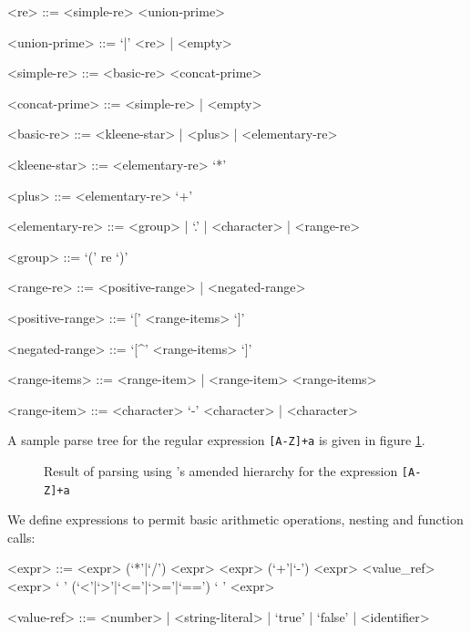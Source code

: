\documentclass[a4paper,openany,12pt]{book}
\begin{document}
\begin{grammar}

    <re> ::= <simple-re> <union-prime>

    <union-prime> ::= `|' <re> | <empty>

    <simple-re> ::= <basic-re> <concat-prime>

    <concat-prime> ::= <simple-re> | <empty>

    <basic-re> ::= <kleene-star> | <plus> | <elementary-re>

    <kleene-star> ::= <elementary-re> `*'

    <plus> ::= <elementary-re> `+'

    <elementary-re> ::= <group> | `.' | <character> | <range-re>

    <group> ::= `(' re `)'

    <range-re> ::= <positive-range> | <negated-range>

    <positive-range> ::= `[' <range-items> `]'

    <negated-range> ::= `[^' <range-items> `]'

    <range-items> ::= <range-item> | <range-item> <range-items>

    <range-item> ::= <character> `-' <character> | <character>

\end{grammar}

A sample parse tree for the regular expression \texttt{[A-Z]+a} is given in figure \ref{fig:regex:parsetree}.

\begin{figure}
\begin{MyMdframed}
\vspace{0.5em}

\caption{\label{fig:regex:parsetree}Result of parsing using \citeauthor{cameron1999}'s amended hierarchy for the expression \texttt{[A-Z]+a}}
\vspace{0.5em}
\captionsetup{style=default}
 \begin{center}
    
    \end{center}
\end{MyMdframed}
\end{figure}

We define expressions to permit basic arithmetic operations, nesting and function calls:

\begin{grammar}
<expr> ::= <expr> (`*'|`/') <expr>
    \alt <expr> (`+'|`-') <expr>
    \alt <value_ref>
    \alt <expr> ` ' (`<'|`>'|`<='|`>='|`==') ` ' <expr>

<value-ref> ::= <number> | <string-literal> | `true' | `false' | <identifier>
\end{grammar}
\end{document}
